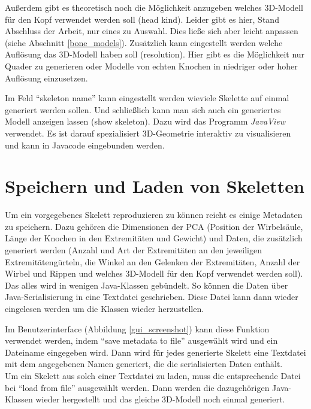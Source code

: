 Außerdem gibt es theoretisch noch die Möglichkeit anzugeben welches 3D-Modell für den Kopf verwendet werden soll (head kind). Leider gibt es hier, Stand Abschluss der Arbeit, nur eines zu Auswahl. Dies ließe sich aber leicht anpassen (siehe Abschnitt \ref{bone_models}).
Zusätzlich kann eingestellt werden welche Auflösung das 3D-Modell haben soll (resolution). Hier gibt es die Möglichkeit nur Quader zu generieren oder Modelle von echten Knochen in niedriger oder hoher Auflösung einzusetzen.

Im Feld "`skeleton name"' kann eingestellt werden wieviele Skelette auf einmal generiert werden sollen. Und schließlich kann man sich auch ein generiertes Modell anzeigen lassen (show skeleton). Dazu wird das Programm \emph{JavaView} \cite{JavaView} verwendet. Es ist darauf spezialisiert 3D-Geometrie interaktiv zu visualisieren und kann in Javacode eingebunden werden.


\section{Speichern und Laden von Skeletten}
\label{load_skeletons}

Um ein vorgegebenes Skelett reproduzieren zu können reicht es einige Metadaten zu speichern. Dazu gehören die Dimensionen der PCA (Position der Wirbelsäule, Länge der Knochen in den Extremitäten und Gewicht) und Daten, die zusätzlich generiert werden (Anzahl und Art der Extremitäten an den jeweiligen Extremitätengürteln, die Winkel an den Gelenken der Extremitäten, Anzahl der Wirbel und Rippen und welches 3D-Modell für den Kopf verwendet werden soll).
Das alles wird in wenigen Java-Klassen gebündelt. So können die Daten über Java-Serialisierung \cite{JavaSerialization} in eine Textdatei geschrieben. Diese Datei kann dann wieder eingelesen werden um die Klassen wieder herzustellen.

Im Benutzerinterface (Abbildung \ref{gui_screenshot}) kann diese Funktion verwendet werden, indem "`save metadata to file"' ausgewählt wird und ein Dateiname eingegeben wird. Dann wird für jedes generierte Skelett eine Textdatei mit dem angegebenen Namen generiert, die die serialisierten Daten enthält.\\
Um ein Skelett aus solch einer Textdatei zu laden, muss die entsprechende Datei bei "`load from file"' ausgewählt werden. Dann werden die dazugehörigen Java-Klassen wieder hergestellt und das gleiche 3D-Modell noch einmal generiert.

